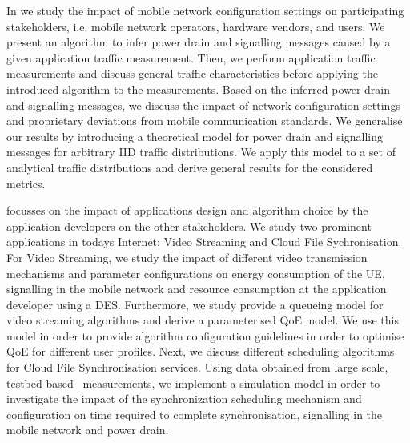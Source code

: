 In  we study the impact of mobile network configuration settings on participating stakeholders, i.e. mobile network operators, hardware vendors, and users.
We present an algorithm to infer power drain and signalling messages caused by a given application traffic measurement.
Then, we perform application traffic measurements and discuss general traffic characteristics before applying the introduced algorithm to the measurements.
Based on the inferred power drain and signalling messages, we discuss the impact of network configuration settings and proprietary deviations from mobile communication standards.
We generalise our results by introducing a theoretical model for power drain and signalling messages for arbitrary \gls{IID} traffic distributions.
We apply this model to a set of analytical traffic distributions and derive general results for the considered  metrics. 

 focusses on the impact of applications design and algorithm choice by the application developers on the other stakeholders.
We study two prominent applications in todays Internet: Video Streaming and Cloud File Sychronisation.
For Video Streaming, we study the impact of different video transmission mechanisms and parameter configurations on energy consumption of the \gls{UE}, signalling in the mobile network and resource consumption at the application developer using a \gls{DES}.
Furthermore, we study provide a queueing model for video streaming algorithms and derive a parameterised \gls{QoE} model.
We use this model in order to provide algorithm configuration guidelines in order to optimise \gls{QoE} for different user profiles.
Next, we discuss different scheduling algorithms for Cloud File Synchronisation services.
Using data obtained from large scale, testbed based~\cite{Chun2003} measurements, we implement a simulation model in order to investigate the impact of the synchronization scheduling mechanism and configuration on time required to complete synchronisation, signalling in the mobile network and power drain.  

